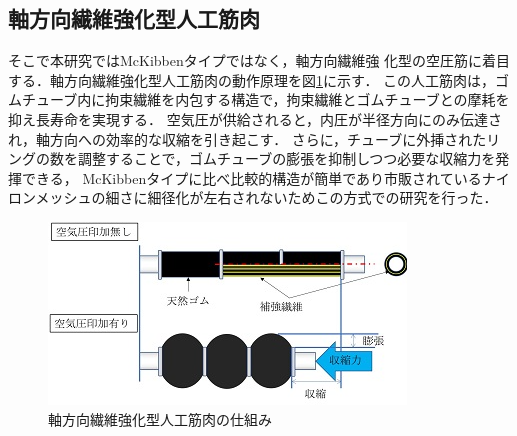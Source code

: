 \subsection{軸方向繊維強化型人工筋肉}
そこで本研究ではMcKibbenタイプではなく，軸方向繊維強
化型の空圧筋\cite{90}に着目する．軸方向繊維強化型人工筋肉の動作原理を図\ref{fig:siku}に示す．
この人工筋肉は，ゴムチューブ内に拘束繊維を内包する構造で，拘束繊維とゴムチューブとの摩耗を抑え長寿命を実現する．
空気圧が供給されると，内圧が半径方向にのみ伝達され，軸方向への効率的な収縮を引き起こす．
さらに，チューブに外挿されたリングの数を調整することで，ゴムチューブの膨張を抑制しつつ必要な収縮力を発揮できる\cite{90}，
McKibbenタイプに比べ比較的構造が簡単であり市販されているナイロンメッシュの細さに細径化が左右されないためこの方式での研究を行った．
\begin{figure}[h]
  \centering  %
  \includegraphics[scale=1]{pic/A.PNG}
  \caption{軸方向繊維強化型人工筋肉の仕組み\cite{90}}
  \label{fig:siku}
\end{figure}



